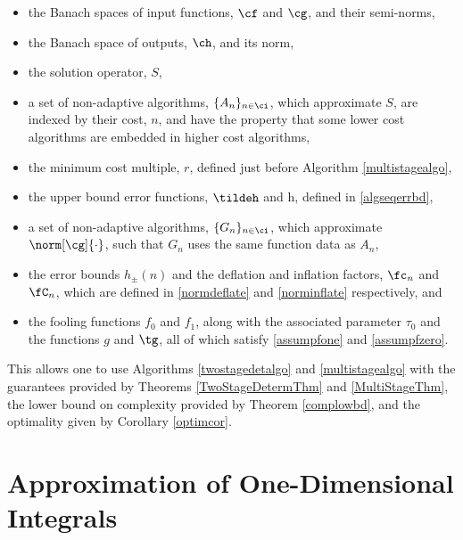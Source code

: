 \documentclass[]{elsarticle}
\theoremstyle{definition}
\theoremstyle{remark}
\begin{document}
\begin{itemize}

\item the Banach spaces of input functions, $\cf$ and $\cg$, and their semi-norms, 

\item the Banach space of outputs, $\ch$, and its norm,

\item the solution operator, $S$,

\item a set of non-adaptive algorithms, $\{A_n\}_{n \in \ci}$, which approximate $S$, are indexed by their cost, $n$, and have the property that some lower cost algorithms are embedded in higher cost algorithms,

\item the minimum cost multiple, $r$, defined just before Algorithm \ref{multistagealgo},

\item the upper bound error functions, $\tildeh$ and h, defined in \eqref{algseqerrbd}, 

\item a set of non-adaptive algorithms, $\{G_n\}_{n \in \ci}$, which approximate $\norm[\cg]{\cdot}$, such that $G_n$ uses the same function data as $A_n$,

\item the error bounds $h_{\pm}(n)$ and the deflation and inflation factors, $\fc_n$ and $\fC_n$, which are defined in \eqref{normdeflate} and \eqref{norminflate} respectively, and

\item the fooling functions $f_0$ and $f_1$, along with the associated parameter $\tau_0$ and the functions $g$ and $\tg$, all of which satisfy \eqref{assumpfone} and \eqref{assumpfzero}.

\end{itemize}
This allows one to use Algorithms \ref{twostagedetalgo} and \ref{multistagealgo} with the guarantees provided by Theorems \ref{TwoStageDetermThm} and \ref{MultiStageThm}, the lower bound on complexity provided by Theorem \ref{complowbd}, and the optimality given by Corollary \ref{optimcor}.


\section{Approximation of One-Dimensional Integrals} \label{integsec}


\end{document}
